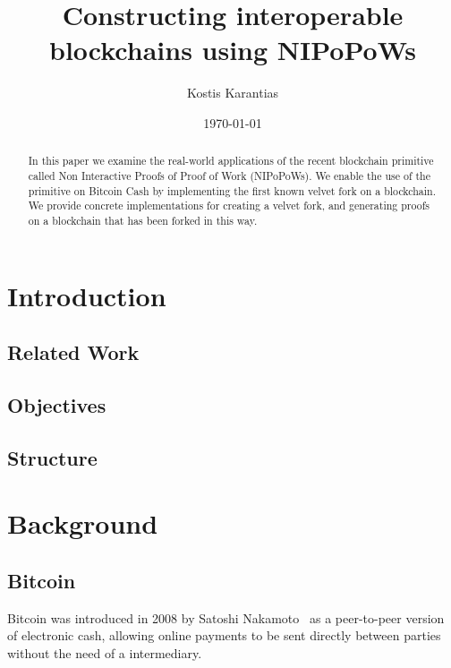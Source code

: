 \documentclass[11pt]{llncs}
\begin{document}
\title{Constructing interoperable blockchains using NIPoPoWs}
\date{\today}
\author{Kostis Karantias\\
    }
\maketitle
\noindent
\makebox[\linewidth]{\small \today}

\newpage

\begin{abstract}
  In this paper we examine the real-world applications of the recent blockchain
  primitive called Non Interactive Proofs of Proof of Work (NIPoPoWs). We
  enable the use of the primitive on Bitcoin Cash by implementing the first
  known velvet fork on a blockchain. We provide concrete implementations for
  creating a velvet fork, and generating proofs on a blockchain that has been
  forked in this way.
\end{abstract}

\newpage

\tableofcontents

\newpage

\thispagestyle{plain}

\section{Introduction}

\subsection{Related Work}
\subsection{Objectives}
\subsection{Structure}

\section{Background}

\subsection{Bitcoin}
Bitcoin was introduced in 2008 by Satoshi Nakamoto~\cite{bitcoin} as a
peer-to-peer version of electronic cash, allowing online payments to be sent
directly between parties without the need of a intermediary.
\end{document}
